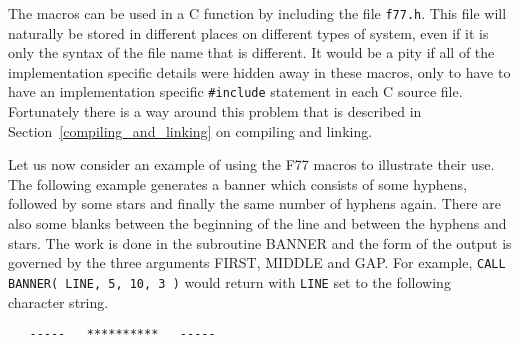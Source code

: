\documentclass[twoside,11pt]{article}
\newcommand{\htmlref}[2]{#1}
\newcommand{\latex}[1]{#1}
\renewcommand{\_}{\texttt{\symbol{95}}}
\begin{document}
The macros can be used in a C function by including the file \texttt{f77.h}. 
This file will naturally be stored in different places on different types of 
system, even if it is only the syntax of the file name that is different. 
It would be a
pity if all of the implementation specific details were hidden away in these
macros, only to have to have an implementation specific \texttt{\#include}
statement in each C source file. Fortunately there is a way around this
problem that is described in 
\latex{Section~\ref{compiling_and_linking} on} \htmlref{compiling and 
linking}{compiling_and_linking}.

Let us now consider an example of using the F77 macros to illustrate
their use.
The following example generates a banner which
consists of some hyphens, followed by some stars and finally the same number
of hyphens again. There are also some blanks between the beginning of the line
and between the hyphens and stars. The work is done in the subroutine BANNER
and the form of the output is governed by the three arguments FIRST, MIDDLE and
GAP\@. For example, 
\texttt{CALL BANNER( LINE, 5, 10, 3 )} would return with \texttt{LINE} set to
the following character string.

\begin{verbatim}
   -----   **********   -----
\end{verbatim}
\end{document}
